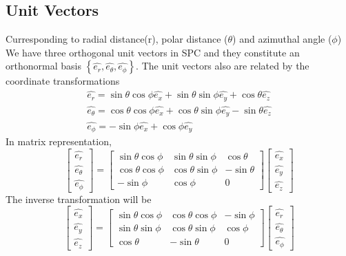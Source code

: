 		\subsection{Unit Vectors}
		Curresponding to radial distance(r), polar distance ($\theta$) and azimuthal angle ($\phi$) We have three orthogonal unit vectors in SPC and they constitute an orthonormal basis $\left\lbrace \hat{e_{r}},\hat{e_{\theta}},\hat{e_{\phi}} \right\rbrace $. The unit vectors also are related by the coordinate transformations
		$$
		\begin{array}{l}
		\hat{e_{r}}=\sin \theta \cos \phi \hat{e_{x}}+\sin \theta \sin \phi \hat{e_{y}}+\cos \theta \hat{e_{z}} \\
		\hat{e_{\theta}}=\cos \theta \cos \phi \hat{e_{x}}+\cos \theta \sin \phi \hat{e_{y}}-\sin \theta \hat{e_{z}} \\
		\hat{e_{\phi}}=-\sin \phi \hat{e_{x}}+\cos \phi \hat{e_{y}}
		\end{array}
		$$
		 In matrix representation,
		$$\left[\begin{array}{c}
			\hat{e_{r}} \\
			\hat{e_{\theta}} \\
			\hat{e_{\phi}}
		\end{array}\right]=\left[\begin{array}{ccc}
			\sin \theta \cos \phi & \sin \theta \sin \phi & \cos \theta \\
			\cos \theta \cos \phi & \cos \theta \sin \phi & -\sin \theta \\
			-\sin \phi & \cos \phi & 0
		\end{array}\right]\left[\begin{array}{c}
			\hat{e_{x}} \\
			\hat{e_{y}} \\
			\hat{e_{z}}
		\end{array}\right]$$
		The inverse transformation will be
			$$\left[\begin{array}{c}
			\hat{e_{x}} \\
			\hat{e_{y}} \\
			\hat{e_{z}}
		\end{array}\right]=\left[\begin{array}{ccc}
		\sin \theta \cos \phi & \cos \theta \cos \phi & -\sin \phi \\
		\sin \theta \sin \phi & \cos \theta \sin \phi & \cos \phi \\
		\cos \theta & -\sin \theta & 0
		\end{array}\right]\left[\begin{array}{c}
		\hat{e_{r}} \\
		\hat{e_{\theta}} \\
		\hat{e_{\phi}}
		\end{array}\right]$$
